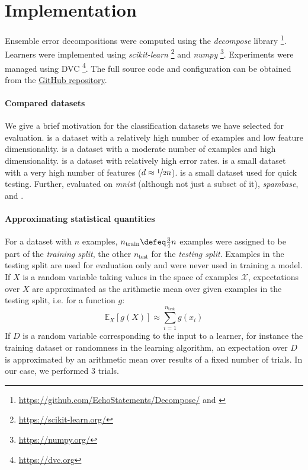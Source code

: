 \documentclass[
	twoside=false, %
]{kaobook}
\begin{document}
\section{Implementation}

Ensemble error decompositions were computed using the \textit{decompose} library
\footnote{
  \url{https://github.com/EchoStatements/Decompose/} and \cite{wood_BiasVarianceDecompositionsMargin_2022}
}. Learners were implemented using \textit{scikit-learn} \footnote{
  \url{https://scikit-learn.org/}
} and \textit{numpy} \footnote{\url{https://numpy.org/}}.
Experiments were managed using \textsc{DVC} \footnote{\url{https://dvc.org}}. The full source code and configuration can be obtained from the \href{https://github.com/xnhp/}{GitHub repository}. 

\paragraph{Compared datasets} We give a brief motivation for the classification datasets we have selected for evaluation. 
\cover is a dataset with a relatively high number of examples and low feature dimensionality. \mnist is a dataset with a moderate number of examples and high dimensionality. \diabetes is a dataset with relatively high error rates. \bioresponse is a small dataset with a very high number of features ($d \approx \nicefrac{1}{2}n$). \qsar is a small dataset used for quick testing.
Further, \cite{bernard, xuChen} evaluated on \textit{mnist} (although not just a subset of it), \textit{spambase}, \digits and \diabetes.

\paragraph{Approximating statistical quantities} 
For a dataset with $n$ examples, $n_{\text{train}} \defeq \frac{3}{4}n$ examples were assigned to be part of the \textit{training split}, the other $n_{\text{test}}$ for the \textit{testing split}. Examples in the testing split are used for evaluation only and were never used in training a model.
If $X$ is a random variable taking values in the space of examples $\mathcal{X}$, expectations over $X$ are approximated as the arithmetic mean over given examples in the testing split, i.e. for a function $g$:
$$
\mathbb{E}_X \left[ g(X) \right]  \approx \sum_{i=1}^{n_\text{test}} g(x_i)
$$
If $D$ is a random variable corresponding to the input to a learner, for instance the training dataset or randomness in the learning algorithm, an expectation over $D$ is approximated by an arithmetic mean over results of a fixed number of trials. In our case, we performed $3$ trials. %
\end{document}
